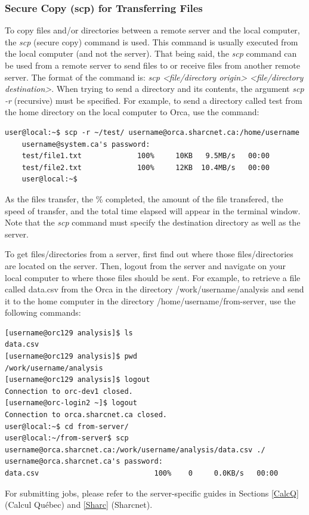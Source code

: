 \documentclass[12pt]{article}
\begin{document}
\subsubsection{Secure Copy (scp) for Transferring Files}\label{scp}

\quad To copy files and/or directories between a remote server and the local computer, the \textit{scp} (secure copy) command is used. This command is usually executed from the local computer (and not the server). That being said, the \textit{scp} command can be used from a remote server to send files to or receive files from another remote server. The format of the command is: \textit{scp <file/directory origin> <file/directory destination>}. When trying to send a directory and its contents, the argument \textit{scp -r} (recursive) must be specified. For example, to send a directory called test from the home directory on the local computer to Orca, use the command:

\begin{lstlisting}[numbers=none]
	user@local:~$ scp -r ~/test/ username@orca.sharcnet.ca:/home/username
	username@system.ca's password:
	test/file1.txt             100% 	10KB   9.5MB/s   00:00 	
	test/file2.txt             100% 	12KB  10.4MB/s   00:00	
	user@local:~$ 
\end{lstlisting}
As the files transfer, the \% completed, the amount of the file transfered, the speed of transfer, and the total time elapsed will appear in the terminal window. Note that the \textit{scp} command must specify the destination directory as well as the server.

\quad To get files/directories from a server, first find out where those files/directories are located on the server. Then, logout from the server and navigate on your local computer to where those files should be sent. For example, to retrieve a file called data.csv from the Orca in the directory /work/username/analysis and send it to the home computer in the directory /home/username/from-server, use the following commands:

\begin{lstlisting}[numbers=none]
[username@orc129 analysis]$ ls
data.csv
[username@orc129 analysis]$ pwd
/work/username/analysis
[username@orc129 analysis]$ logout
Connection to orc-dev1 closed.
[username@orc-login2 ~]$ logout
Connection to orca.sharcnet.ca closed.
user@local:~$ cd from-server/
user@local:~/from-server$ scp username@orca.sharcnet.ca:/work/username/analysis/data.csv ./
username@orca.sharcnet.ca's password: 
data.csv                           100%    0     0.0KB/s   00:00  
\end{lstlisting}
\quad\enskip\quad For submitting jobs, please refer to the server-specific guides in Sections \ref{CalcQ} (Calcul Qu\'{e}bec) and \ref{Sharc} (Sharcnet).
\end{document}
